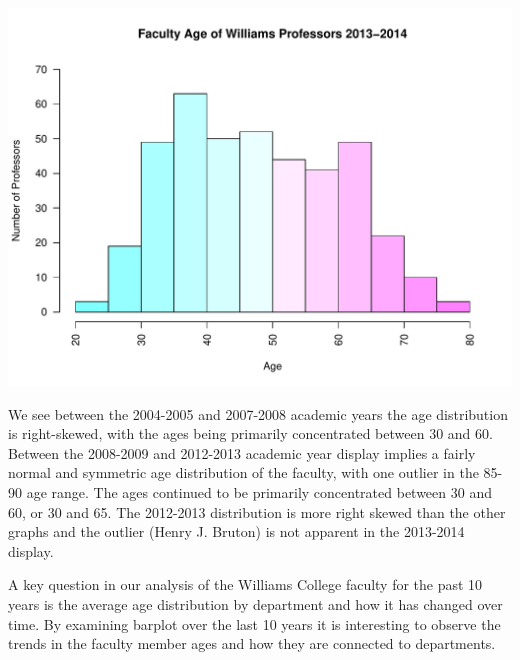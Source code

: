 \documentclass[12pt,a4paper]{article}\usepackage[]{graphicx}\usepackage[]{color}
\makeatletter
\def\maxwidth{ %
  \ifdim\Gin@nat@width>\linewidth
    \linewidth
  \else
    \Gin@nat@width
  \fi
}
\newenvironment{knitrout}{}{} %
\theoremstyle{definition}
\makeatother
\begin{document}
\begin{knitrout}
\includegraphics[width=\maxwidth]{figure/unnamed-chunk-8-10} 

\end{knitrout}


\bigskip
We see between the 2004-2005 and 2007-2008 academic years the age distribution is right-skewed, with the ages being primarily concentrated between 30 and 60. Between the 2008-2009 and 2012-2013 academic year display implies a fairly normal and symmetric age distribution of the faculty, with one outlier in the 85-90 age range. The ages continued to be primarily concentrated between 30 and 60, or 30 and 65. The 2012-2013 distribution is more right skewed than the other graphs and the outlier (Henry J. Bruton) is not apparent in the 2013-2014 display.

\bigskip
A key question in our analysis of the Williams College faculty for the past 10 years is the average age distribution by department and how it has changed over time. By examining barplot over the last 10 years it is interesting to observe the trends in the faculty member ages and how they are connected to departments.
\end{document}
